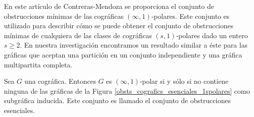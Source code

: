 En este artículo de Contreras-Mendoza \cite{Fernando} se proporciona el conjunto de obstrucciones mínimas de las cográficas $(\infty, 1)$-polares. Este conjunto es utilizado para describir cómo se puede obtener el conjunto de obstrucciones mínimas de cualquiera de las clases de cográficas $(s,1)$-polares dado un entero $s \geq 2$. En nuestra investigación encontramos un resultado similar a éste para las gráficas que aceptan una partición en un conjunto independiente y una gráfica multipartita completa. 

\begin{theorem}
    Sea $G$ una cográfica. Entonces $G$ es $(\infty,1)$-polar si y sólo si no contiene ninguna de las gráficas de la Figura \ref{obsts_cografics_esenciales_1spolares} como subgráfica inducida. Este conjunto es llamado el conjunto de obstrucciones esenciales.
\end{theorem}

